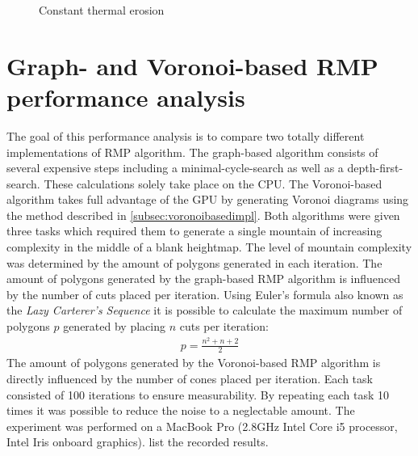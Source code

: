 \documentclass[11pt,a4paper,twoside,openright]{report}
\begin{document}
\begin{figure}[!htb]
  \caption{Constant thermal erosion}\label{fig:thermalafter2}
\endminipage
\end{figure}

\section{Graph- and Voronoi-based RMP performance analysis}
The goal of this performance analysis is to compare two totally different implementations of RMP algorithm. The graph-based algorithm consists of several expensive steps including a minimal-cycle-search as well as a depth-first-search. These calculations solely take place on the CPU. The Voronoi-based algorithm takes full advantage of the GPU by generating Voronoi diagrams using the method described in \cref{subsec:voronoibasedimpl}. Both algorithms were given three tasks which required them to generate a single mountain of increasing complexity in the middle of a blank heightmap. The level of mountain complexity was determined by the amount of polygons generated in each iteration. The amount of polygons generated by the graph-based RMP algorithm is influenced by the number of cuts placed per iteration. Using Euler's formula also known as the \emph{Lazy Carterer's Sequence} \cite{Moore:1991} it is possible to calculate the maximum number of polygons $p$ generated by placing $n$ cuts per iteration:
\begin{align}
  p = \frac{n^2 + n + 2}{2}
\end{align}
The amount of polygons generated by the Voronoi-based RMP algorithm is directly influenced by the number of cones placed per iteration. Each task consisted of 100 iterations to ensure measurability. By repeating each task 10 times it was possible to reduce the noise to a neglectable amount. The experiment was performed on a MacBook Pro (2.8GHz Intel Core i5 processor, Intel Iris onboard graphics).  list the recorded results.
\end{document}
